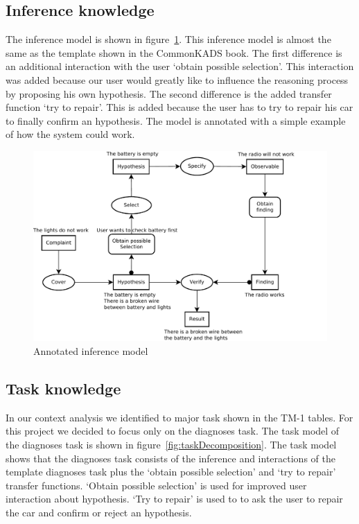 \subsection{Inference knowledge}
The inference model is shown in figure~\ref{fig:InferenceModel}. This inference
model is almost the same as the template shown in the CommonKADS book.
The first difference is an additional interaction with the user `obtain possible
selection'. This interaction was added because our user would greatly like to
influence the reasoning process by proposing his own hypothesis. The second
difference is the added transfer function `try to repair'. This is added because
the user has to try to repair his car to finally confirm an hypothesis. The model is
annotated with a simple example of how the system could work.

\begin{figure}[htbp]
	\centering
		\includegraphics[width=1.00\textwidth]{inferenceModel.pdf}
	\caption{Annotated inference model}
	\label{fig:InferenceModel}
\end{figure}


\subsection{Task knowledge}
In our context analysis we identified to major task shown in the TM-1 tables.
For this project we decided to focus only on the diagnoses task. The task model
of the diagnoses task is shown in figure~\ref{fig:taskDecomposition}. The task
model shows that the diagnoses task consists of the inference and
interactions of the template diagnoses task plus the `obtain possible selection'
and `try to repair' transfer functions. `Obtain possible selection' is used for 
improved user interaction about hypothesis.
`Try to repair' is used to to ask the user to repair the car and confirm or
reject an hypothesis.

